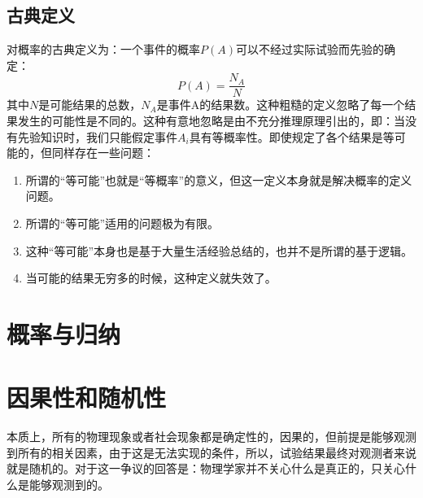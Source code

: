 \documentclass{ctexart}
\begin{document}
        \subsection{古典定义}
            对概率的古典定义为：一个事件的概率$P(A)$可以不经过实际试验而先验的确定：
                \begin{equation}
                    P(A) = \frac{N_A}{N}
                    \label{f1-7}
                \end{equation}
            其中$N$是可能结果的总数，$N_A$是事件A的结果数。这种粗糙的定义忽略了每一个结果发生的可能性是不同的。这种有意地忽略是由不充分推理原理引出的，即：当没有先验知识时，我们只能假定事件$A_i$具有等概率性。即使规定了各个结果是等可能的，但同样存在一些问题：
            \begin{enumerate}
                \item 所谓的“等可能”也就是“等概率”的意义，但这一定义本身就是解决概率的定义问题。
                \item 所谓的“等可能”适用的问题极为有限。
                \item 这种“等可能”本身也是基于大量生活经验总结的，也并不是所谓的基于逻辑。
                \item 当可能的结果无穷多的时候，这种定义就失效了。
            \end{enumerate}
    \section{概率与归纳}
    \section{因果性和随机性}
        本质上，所有的物理现象或者社会现象都是确定性的，因果的，但前提是能够观测到所有的相关因素，由于这是无法实现的条件，所以，试验结果最终对观测者来说就是随机的。对于这一争议的回答是：物理学家并不关心什么是真正的，只关心什么是能够观测到的。
        
\end{document}
